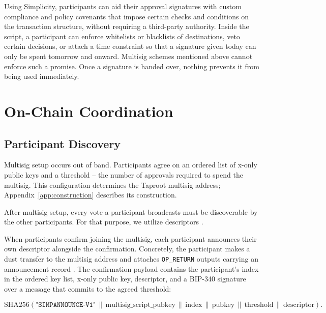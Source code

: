 \documentclass[11pt]{article}
\begin{document}
    Using Simplicity, participants can aid their approval signatures with custom compliance and policy covenants that impose certain checks and conditions on the transaction structure, without requiring a third-party authority. Inside the script, a participant can enforce whitelists or blacklists of destinations, veto certain decisions, or attach a time constraint so that a signature given today can only be spent tomorrow and onward. Multisig schemes mentioned above cannot enforce such a promise. Once a signature is handed over, nothing prevents it from being used immediately.


    \section{On-Chain Coordination}
    \label{sec:coordination}

    \subsection{Participant Discovery}
    \label{sec:discovery}

    Multisig setup occurs out of band. Participants agree on an ordered list of x-only public keys and a threshold -- the number of approvals required to spend the multisig. This configuration determines the Taproot multisig address; Appendix~\ref{app:construction} describes its construction.

    After multisig setup, every vote a participant broadcasts must be discoverable by the other participants. For that purpose, we utilize descriptors \cite{bip380}.

    When participants confirm joining the multisig, each participant announces their own descriptor alongside the confirmation. Concretely, the participant makes a dust transfer to the multisig address and attaches \texttt{OP\_RETURN} outputs carrying an announcement record \cite{native-multisig-announcement}. The confirmation payload contains the participant's index in the ordered key list, x-only public key, descriptor, and a BIP-340 signature over a message that commits to the agreed threshold:

    \begin{equation}
        \mathrm{SHA256}(
        \texttt{"SIMPANNOUNCE-V1"}
        \,\|\, \mathrm{multisig\_script\_pubkey}
        \,\|\, \mathrm{index}
        \,\|\, \mathrm{pubkey}
        \,\|\, \mathrm{threshold}
        \,\|\, \mathrm{descriptor}
        ).
    \end{equation}
\end{document}
